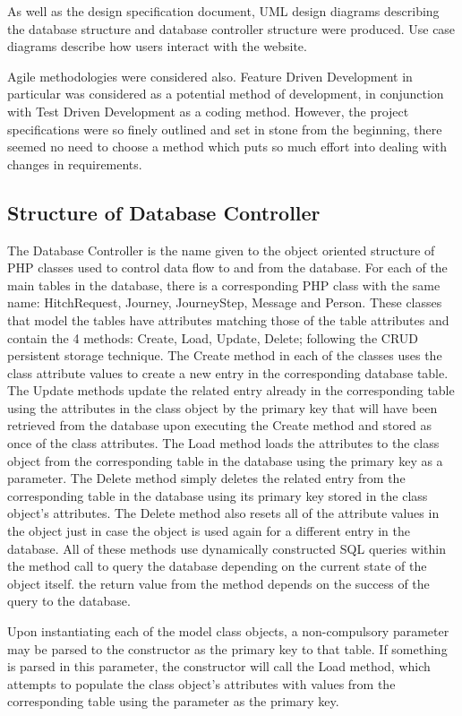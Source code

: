 		As well as the design specification document, UML design diagrams describing the database structure and database controller structure were produced. Use case diagrams describe how users interact with the website.
		
		Agile methodologies were considered also. Feature Driven Development in particular was considered as a potential method of development, in conjunction with Test Driven Development as a coding method. However, the project specifications were so finely outlined and set in stone from the beginning, there seemed no need to choose a method which puts so much effort into dealing with changes in requirements.
		
	\subsection{Structure of Database Controller}
		The Database Controller is the name given to the object oriented structure of PHP classes used to control data flow to and from the database. For each of the main tables in the database, there is a corresponding PHP class with the same name: Hitch\textunderscore Request, Journey, Journey\textunderscore Step, Message and Person. These classes that model the tables have attributes matching those of the table attributes and contain the 4 methods: Create, Load, Update, Delete; following the CRUD persistent storage technique\cite{crud_technique}. The Create method in each of the classes uses the class attribute values to create a new entry in the corresponding database table. The Update methods update the related entry already in the corresponding table using the attributes in the class object by the primary key that will have been retrieved from the database upon executing the Create method and stored as once of the class attributes. The Load method loads the attributes to the class object from the corresponding table in the database using the primary key as a parameter. The Delete method simply deletes the related entry from the corresponding table in the database using its primary key stored in the class object's attributes. The Delete method also resets all of the attribute values in the object just in case the object is used again for a different entry in the database. All of these methods use dynamically constructed SQL queries within the method call to query the database depending on the current state of the object itself. the return value from the method depends on the success of the query to the database.
		
		Upon instantiating each of the model class objects, a non-compulsory parameter may be parsed to the constructor as the primary key to that table. If something is parsed in this parameter, the constructor will call the Load method, which attempts to populate the class object's attributes with values from the corresponding table using the parameter as the primary key.
		
